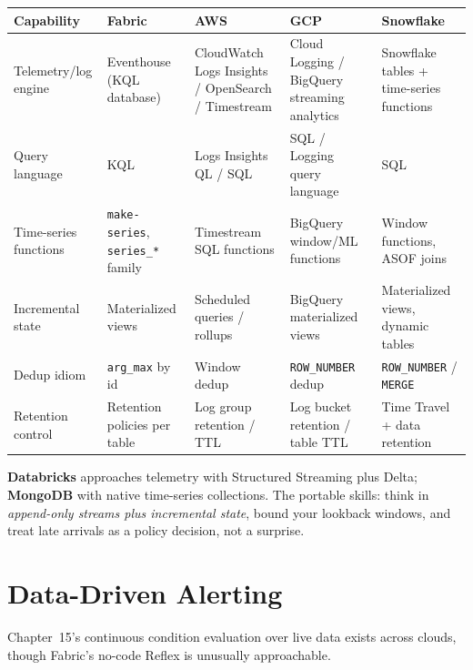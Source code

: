 \begin{center}
\footnotesize
\begin{tabular}{@{}p{2.8cm}p{3.2cm}p{3.2cm}p{3.2cm}p{3.2cm}@{}}
\toprule
\textbf{Capability} & \textbf{Fabric} & \textbf{AWS} & \textbf{GCP} & \textbf{Snowflake} \\
\midrule
Telemetry/log engine & Eventhouse (KQL database) & CloudWatch Logs Insights / OpenSearch / Timestream & Cloud Logging / BigQuery streaming analytics & Snowflake tables + time-series functions \\
Query language & KQL & Logs Insights QL / SQL & SQL / Logging query language & SQL \\
Time-series functions & \texttt{make-series}, \texttt{series\_*} family & Timestream SQL functions & BigQuery window/ML functions & Window functions, ASOF joins \\
Incremental state & Materialized views & Scheduled queries / rollups & BigQuery materialized views & Materialized views, dynamic tables \\
Dedup idiom & \texttt{arg\_max} by id & Window dedup & \texttt{ROW\_NUMBER} dedup & \texttt{ROW\_NUMBER} / \texttt{MERGE} \\
Retention control & Retention policies per table & Log group retention / TTL & Log bucket retention / table TTL & Time Travel + data retention \\
\bottomrule
\end{tabular}
\end{center}

\noindent \textbf{Databricks} approaches telemetry with Structured Streaming plus Delta;
\textbf{MongoDB} with native time-series collections. The portable skills: think in
\emph{append-only streams plus incremental state}, bound your lookback windows, and treat late
arrivals as a policy decision, not a surprise.

\section{Data-Driven Alerting}
%
Chapter~15's continuous condition evaluation over live data exists across clouds, though
Fabric's no-code Reflex is unusually approachable.

